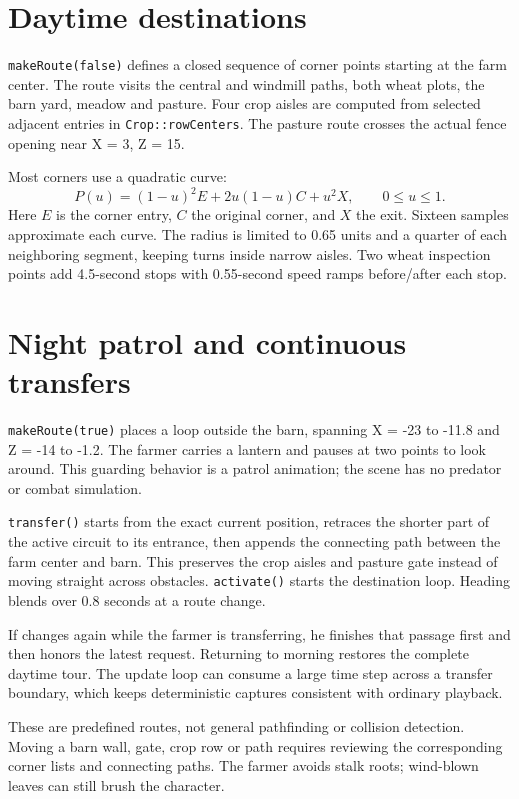 \documentclass[11pt,a4paper,openany]{book}
\newcommand{\code}[1]{\texttt{#1}}
\newcommand{\keycap}[1]{\begingroup\setlength{\fboxsep}{0.8pt}\raisebox{0.05ex}{\fbox{\footnotesize\texttt{#1}}}\endgroup}
\begin{document}
\section{Daytime destinations}
\code{makeRoute(false)} defines a closed sequence of corner points starting at the farm center. The route visits the central and windmill paths, both wheat plots, the barn yard, meadow and pasture. Four crop aisles are computed from selected adjacent entries in \code{Crop::rowCenters}. The pasture route crosses the actual fence opening near X = 3, Z = 15.

Most corners use a quadratic curve:
\[
P(u)=(1-u)^2E+2u(1-u)C+u^2X, \qquad 0\leq u\leq1.
\]
Here \(E\) is the corner entry, \(C\) the original corner, and \(X\) the exit. Sixteen samples approximate each curve. The radius is limited to 0.65 units and a quarter of each neighboring segment, keeping turns inside narrow aisles. Two wheat inspection points add 4.5-second stops with 0.55-second speed ramps before/after each stop.

\section{Night patrol and continuous transfers}
\code{makeRoute(true)} places a loop outside the barn, spanning X = -23 to -11.8 and Z = -14 to -1.2. The farmer carries a lantern and pauses at two points to look around. This guarding behavior is a patrol animation; the scene has no predator or combat simulation.

\code{transfer()} starts from the exact current position, retraces the shorter part of the active circuit to its entrance, then appends the connecting path between the farm center and barn. This preserves the crop aisles and pasture gate instead of moving straight across obstacles. \code{activate()} starts the destination loop. Heading blends over 0.8 seconds at a route change.

If \keycap{N} changes again while the farmer is transferring, he finishes that passage first and then honors the latest request. Returning to morning restores the complete daytime tour. The update loop can consume a large time step across a transfer boundary, which keeps deterministic captures consistent with ordinary playback.

\begin{warningbox}
	These are predefined routes, not general pathfinding or collision detection. Moving a barn wall, gate, crop row or path requires reviewing the corresponding corner lists and connecting paths. The farmer avoids stalk roots; wind-blown leaves can still brush the character.
\end{warningbox}
\end{document}
